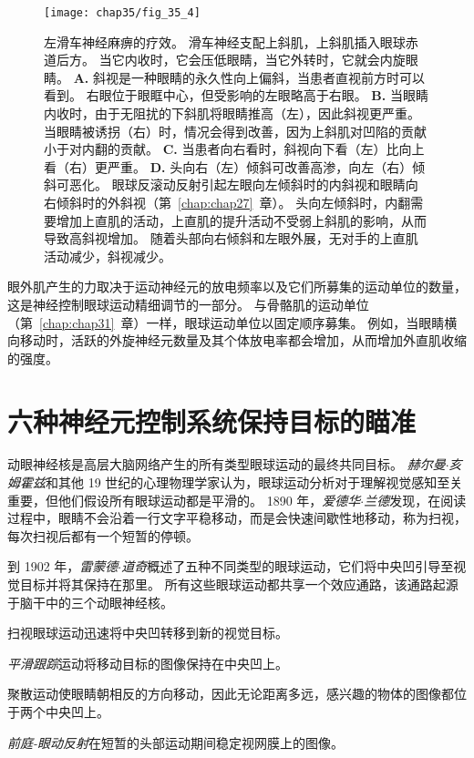 \begin{figure}[htbp]
	\centering
	\texttt{[image: chap35/fig\_35\_4]}
	\caption{左滑车神经麻痹的疗效。
		滑车神经支配上斜肌，上斜肌插入眼球赤道后方。
		当它内收时，它会压低眼睛，当它外转时，它就会内旋眼睛。
		\textbf{A.} 斜视是一种眼睛的永久性向上偏斜，当患者直视前方时可以看到。
		右眼位于眼眶中心，但受影响的左眼略高于右眼。
		\textbf{B.} 当眼睛内收时，由于无阻扰的下斜肌将眼睛推高（左），因此斜视更严重。
		当眼睛被诱拐（右）时，情况会得到改善，因为上斜肌对凹陷的贡献小于对内翻的贡献。
		\textbf{C.} 当患者向右看时，斜视向下看（左）比向上看（右）更严重。
		\textbf{D.} 头向右（左）倾斜可改善高渗，向左（右）倾斜可恶化。
		眼球反滚动反射引起左眼向左倾斜时的内斜视和眼睛向右倾斜时的外斜视（第~\ref{chap:chap27}~章）。
		头向左倾斜时，内翻需要增加上直肌的活动，上直肌的提升活动不受弱上斜肌的影响，从而导致高斜视增加。
		随着头部向右倾斜和左眼外展，无对手的上直肌活动减少，斜视减少。}
	\label{fig:35_4}
\end{figure}


眼外肌产生的力取决于运动神经元的放电频率以及它们所募集的运动单位的数量，这是神经控制眼球运动精细调节的一部分。
与骨骼肌的运动单位（第~\ref{chap:chap31}~章）一样，眼球运动单位以固定顺序募集。
例如，当眼睛横向移动时，活跃的外旋神经元数量及其个体放电率都会增加，从而增加外直肌收缩的强度。



\section{六种神经元控制系统保持目标的瞄准}

动眼神经核是高层大脑网络产生的所有类型眼球运动的最终共同目标。
\textit{赫尔曼$\cdot$亥姆霍兹}和其他 19 世纪的心理物理学家认为，眼球运动分析对于理解视觉感知至关重要，但他们假设所有眼球运动都是平滑的。
1890 年，\textit{爱德华$\cdot$兰德}发现，在阅读过程中，眼睛不会沿着一行文字平稳移动，而是会快速间歇性地移动，称为扫视，每次扫视后都有一个短暂的停顿。


到 1902 年，\textit{雷蒙德$\cdot$道奇}概述了五种不同类型的眼球运动，它们将中央凹引导至视觉目标并将其保持在那里。
所有这些眼球运动都共享一个效应通路，该通路起源于脑干中的三个动眼神经核。


扫视眼球运动迅速将中央凹转移到新的视觉目标。


\textit{平滑跟踪}运动将移动目标的图像保持在中央凹上。


聚散运动使眼睛朝相反的方向移动，因此无论距离多远，感兴趣的物体的图像都位于两个中央凹上。


\textit{前庭-眼动反射}在短暂的头部运动期间稳定视网膜上的图像。


